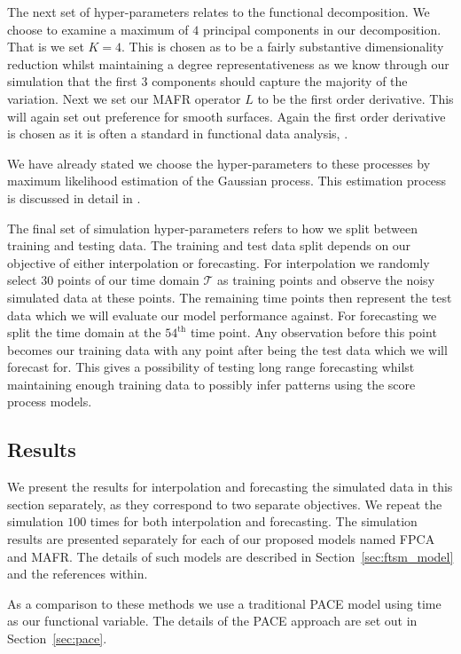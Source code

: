 The next set of hyper-parameters relates to the functional decomposition.
We choose to examine a maximum of $4$ principal components in our decomposition.
That is we set $K = 4$. 
This is chosen as to be a fairly substantive dimensionality reduction whilst maintaining a degree representativeness as we know through our simulation that the first $3$ components should capture the majority of the variation.
Next we set our MAFR operator $L$ to be the first order derivative.
This will again set out preference for smooth surfaces. 
Again the first order derivative is chosen as it is often a standard in functional data analysis, \citep{ramsay_functional_2010}. 

We have already stated we choose the hyper-parameters to these processes by maximum likelihood estimation of the Gaussian process.
This estimation process is discussed in detail in \citep{williams_gaussian_2006}.

The final set of simulation hyper-parameters refers to how we split between training and testing data.
The training and test data split depends on our objective of either interpolation or forecasting.
For interpolation we randomly select $30$ points of our time domain $\mathcal{T}$ as training points and observe the noisy simulated data at these points.
The remaining time points then represent the test data which we will evaluate our model performance against.
For forecasting we split the time domain at the $54^\text{th}$ time point.
Any observation before this point becomes our training data with any point after being the test data which we will forecast for. 
This gives a possibility of testing long range forecasting whilst maintaining enough training data to possibly infer patterns using the score process models.

\subsection{Results \label{ssec:ftsm_sim_res}}
We present the results for interpolation and forecasting the simulated data in this section separately, as they correspond to two separate objectives.
We repeat the simulation $100$ times for both interpolation and forecasting.
The simulation results are presented separately for each of our proposed models named FPCA and MAFR.
The details of such models are described in Section~\ref{sec:ftsm_model} and the references within.

As a comparison to these methods we use a traditional PACE model using time as our functional variable.
The details of the PACE approach are set out in Section~\ref{sec:pace}.

